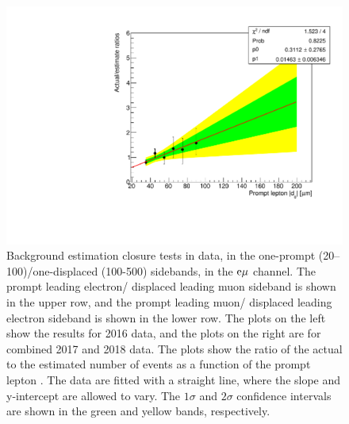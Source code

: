 \begin{figure}[hbtp]
\includegraphics[scale=0.35]{figures/bg/emu_data_2017_2018_displacedElectron_ratiosVsPromptD0.pdf}
\caption{Background estimation closure tests in data, in the one-prompt (20--100\mum)/one-displaced (100-500\mum) sidebands, in the $\mathrm{e}{\mu}$ channel. The prompt leading electron/ displaced leading muon sideband is shown in the upper row, and the prompt leading muon/ displaced leading electron sideband is shown in the lower row. The plots on the left show the results for 2016 data, and the plots on the right are for combined 2017 and 2018 data. The plots show the ratio of the actual to the estimated number of events as a function of the prompt lepton \ad. The data are fitted with a straight line, where the slope and y-intercept are allowed to vary. The $1\sigma$ and $2\sigma$ confidence intervals are shown in the green and yellow bands, respectively.}
\label{100to500um_fits_emu}
\end{figure}


